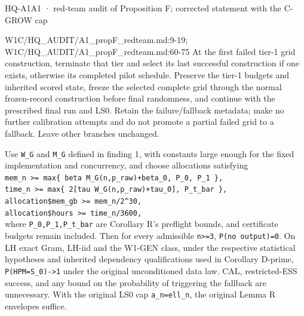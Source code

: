 \begin{card}{HQ-A1}{A1 · red-team audit of Proposition F; corrected statement with the C-GROW cap}
\begin{stmt}{W1C/HQ_AUDIT/A1_propF_redteam.md:9-19; W1C/HQ_AUDIT/A1_propF_redteam.md:60-75}
At the first failed tier-1 grid construction, terminate that tier and select its last successful construction if one exists, otherwise its completed pilot schedule. Preserve the tier-1 budgets and inherited scored state, freeze the selected complete grid through the normal frozen-record construction before final randomness, and continue with the prescribed final run and LS0. Retain the failure/fallback metadata; make no further calibration attempts and do not promote a partial failed grid to a fallback. Leave other branches unchanged.

Use \texttt{W\_G} and \texttt{M\_G} defined in finding 1, with constants large enough for the fixed implementation and concurrency, and choose allocations satisfying\\
\texttt{mem\_n  >= max\{ beta M\_G(n,p\_raw)+beta\_0, P\_0, P\_1 \},}\\
\texttt{time\_n >= max\{ 2[tau W\_G(n,p\_raw)+tau\_0], P\_t\_bar \},}\\
\texttt{allocation\$mem\_gb >= mem\_n/2\textasciicircum{}30,}\\
\texttt{allocation\$hours  >= time\_n/3600,}\\
where \texttt{P\_0,P\_1,P\_t\_bar} are Corollary R's preflight bounds, and certificate budgets remain included. Then for every admissible \texttt{n>=3}, \texttt{P(no output)=0}. On LH exact Gram, LH-iid and the W1-GEN class, under the respective statistical hypotheses and inherited dependency qualifications used in Corollary D-prime, \texttt{P(HPM=S\_0)->1} under the original unconditioned data law. CAL, restricted-ESS success, and any bound on the probability of triggering the fallback are unnecessary. With the original LS0 cap \texttt{a\_n=ell\_n}, the original Lemma R envelopes suffice.


\end{stmt}
\end{card}
